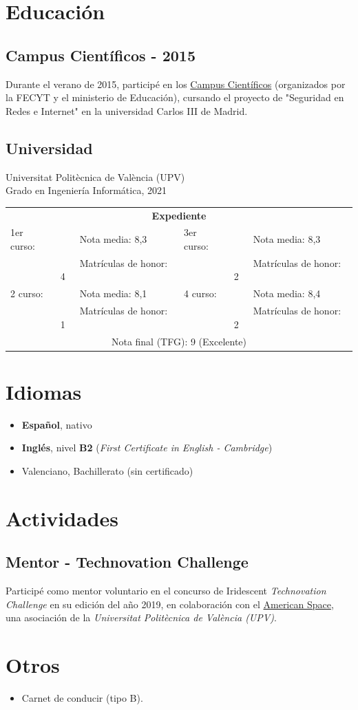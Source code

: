 \documentclass[letterpaper, 12pt]{article}
\newcommand{\uni}{Universitat Politècnica de València (UPV)}
\newcommand{\fce}{\emph{First Certificate in English - Cambridge}}
\newcommand{\grade}[1]{Nota media: #1}
\newcommand{\mh}[1]{Matrículas de honor: #1}
\newcommand{\tabitem}{~~\llap{\textbullet}~~}
\newcommand{\unigrades}[9]{
    \begin{tabular}{|ll<{\hspace{1em}}|>{\hspace{1em}}ll|}
        \hline
        \multicolumn{4}{|c|}{\textbf{Expediente}}\\[.5em]
        1er curso: & \tabitem \grade{#1} & 3er curso: & \tabitem \grade{#5} \\
        & \tabitem \mh{#2} && \tabitem \mh{#6} \\
        2{\textdegree} curso: & \tabitem \grade{#3} & 4{\textdegree} curso: & \tabitem \grade{#7} \\
        & \tabitem \mh{#4} && \tabitem \mh{#8} \\
        \multicolumn{4}{|c|}{\rule{0pt}{1.5em}Nota final (TFG): #9}\\
        \hline
    \end{tabular}
}
\newcommand{\myunigrades}{
    \unigrades
    {8,3}
    {4}
    {8,1}
    {1}
    {8,3}
    {2}
    {8,4}
    {2}
    {9 (Excelente)}
}
\begin{document}
    \pagebreak

    \section{Educación}

    \subsection{Campus Científicos - 2015}

    Durante el verano de 2015, participé en los \href{https://www.campuscientificos.es/}{Campus Científicos} (organizados por la FECYT y el ministerio de Educación), cursando el proyecto de "Seguridad en Redes e Internet" en la universidad Carlos III de Madrid.

    \subsection{Universidad}

    {\uni}\\
    Grado en Ingeniería Informática, 2021\\

    \myunigrades

    \section{Idiomas}

    \begin{itemize}
        \item \textbf{Español}, nativo
        \item \textbf{Inglés}, nivel \textbf{B2} (\fce)
        \item Valenciano, Bachillerato (sin certificado)
    \end{itemize}

    \section{Actividades}

    \subsection{Mentor - Technovation Challenge}

    Participé como mentor voluntario en el concurso de Iridescent \emph{Technovation Challenge} en su edición del año 2019, en colaboración con el \href{https://cdl.upv.es/american-space}{American Space}, una asociación de la \emph{\uni}.

    \section{Otros}

    \begin{itemize}
        \item Carnet de conducir (tipo B).
    \end{itemize}
\end{document}
